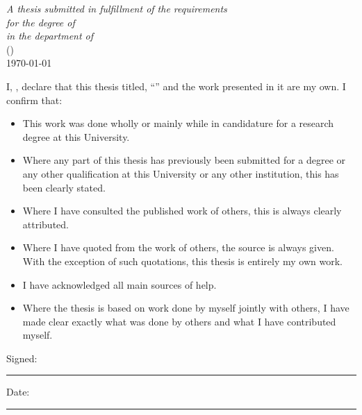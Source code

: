 \documentclass[
11pt, %
oneside, %
english, %
onehalfspacing, %
headsepline, %
]{MastersDoctoralThesis} %
\begin{document}
\begin{titlepage}
\begin{center}
\large \textit{A thesis submitted in fulfillment of the requirements\\ for the degree of \degreename}\\[0.3cm] %
\textit{in the department of}\\[0.4cm]
\deptname (\facname)\\[1.5cm] %
 

{\large \today} %

\end{center}
\end{titlepage}


\begin{declaration}
\addchaptertocentry{\authorshipname} %
\noindent I, \authorname, declare that this thesis titled, \enquote{\ttitle} and the work presented in it are my own. I confirm that:

\begin{itemize} 
\item This work was done wholly or mainly while in candidature for a research degree at this University.
\item Where any part of this thesis has previously been submitted for a degree or any other qualification at this University or any other institution, this has been clearly stated.
\item Where I have consulted the published work of others, this is always clearly attributed.
\item Where I have quoted from the work of others, the source is always given. With the exception of such quotations, this thesis is entirely my own work.
\item I have acknowledged all main sources of help.
\item Where the thesis is based on work done by myself jointly with others, I have made clear exactly what was done by others and what I have contributed myself.\\
\end{itemize}
 
\noindent Signed:\\
\rule[0.5em]{25em}{0.5pt} %
 
\noindent Date:\\
\rule[0.5em]{25em}{0.5pt} %
\end{declaration}
\end{document}
